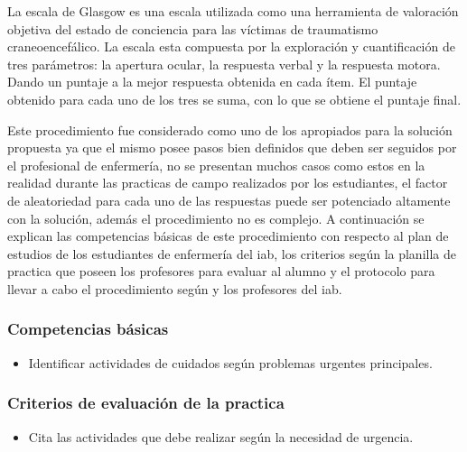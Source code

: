 La escala de Glasgow es una escala utilizada como una herramienta de valoración
objetiva del estado de conciencia para las víctimas de traumatismo
craneoencefálico. La escala esta compuesta por la exploración y cuantificación
de tres parámetros: la apertura ocular, la respuesta verbal y la respuesta
motora. Dando un puntaje a la mejor respuesta obtenida en cada ítem. El puntaje
obtenido para cada uno de los tres se suma, con lo que se obtiene el puntaje
final.

Este procedimiento fue considerado como uno de los apropiados para la solución
propuesta ya que el mismo posee pasos bien definidos que deben ser seguidos por
el profesional de enfermería, no se presentan muchos casos como estos en la
realidad durante las practicas de campo realizados por los estudiantes, el
factor de aleatoriedad para cada uno de las respuestas puede ser potenciado
altamente con la solución, además el procedimiento no es complejo. A
continuación se explican las competencias básicas de este procedimiento con
respecto al plan de estudios de los estudiantes de enfermería del \Gls{iab}, los
criterios según la planilla de practica que poseen los profesores para evaluar
al alumno y el protocolo para llevar a cabo el procedimiento según
\cite{protocolo} y los profesores del \Gls{iab}.

\subsubsection{Competencias básicas}
\begin{itemize}
\item Identificar actividades de cuidados según problemas urgentes principales.
\end{itemize}

\subsubsection{Criterios de evaluación de la practica}
\begin{itemize}
\item Cita las actividades que debe realizar según la necesidad de urgencia.
\end{itemize}


